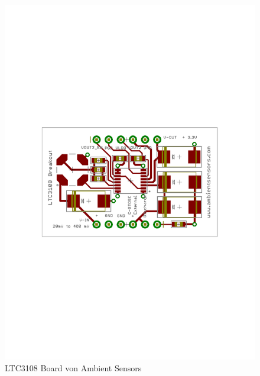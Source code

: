 \documentclass[12pt]{scrreprt} %
\begin{document}
\begin{figure}[htb]
\centering
\includegraphics[bb=3.4cm 10.6cm 17.5cm 19.4cm]{Bilder/LTC3108breakoutSSOC}
\caption{LTC3108 Board von Ambient Sensors}
\label{fig:4.1}
\end{figure}
\end{document}
